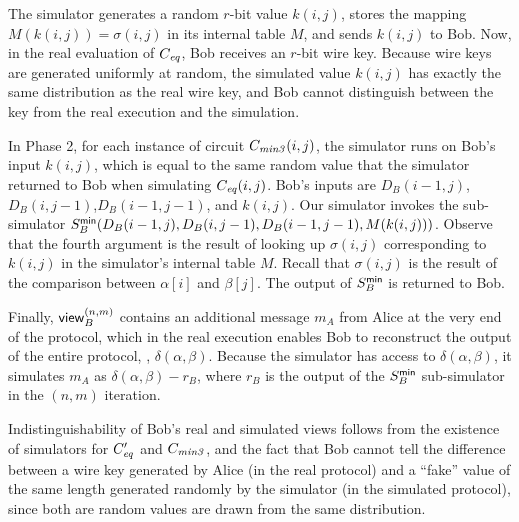 The simulator generates a random $r$-bit value $k(i,j)$, stores the
mapping $M(k(i,j))=\sigma(i,j)$ in its internal table $M$, and sends
$k(i,j)$ to Bob.  Now, in the real evaluation of $C_{\mathit{eq}}$, Bob receives an
$r$-bit wire key.  Because wire keys are generated uniformly at random,
the simulated value $k(i,j)$ has exactly the same distribution as the
real wire key, and Bob cannot distinguish between the key from the real
execution and the simulation.

In Phase 2, for each instance of circuit $C_{\mathit{min3}}(i,j)$, the simulator runs
on Bob's input $k(i,j)$, which is equal to the same random value that the
simulator returned to Bob when simulating $C_{\mathit{eq}}(i,j)$.  Bob's inputs are
$D_B(i-1,j)$,$D_B(i,j-1)$,$D_B(i-1,j-1)$, and $k(i,j)$.  Our simulator
invokes the sub-simulator $S^\mathsf{min}_B(D_B(i-1,j),D_B(i,j-1),D_B(i-1,j-1),
M(k(i,j)))$.  Observe that the fourth argument is the result of looking
up $\sigma(i,j)$ corresponding to $k(i,j)$ in the simulator's internal
table $M$.  Recall that $\sigma(i,j)$ is the result of the comparison
between $\alpha[i]$ and $\beta[j]$.  The output of $S^\mathsf{min}_B$ is returned
to Bob.

Finally, $\mathsf{view}_B^{(n,m)}$ contains an additional message $m_A$ from
Alice at the very end of the protocol, which in the real execution
enables Bob to reconstruct the output of the entire protocol,
\ie, $\delta(\alpha,\beta)$.  Because the simulator has access to
$\delta(\alpha,\beta)$, it simulates $m_A$ as $\delta(\alpha,\beta)-r_B$,
where $r_B$ is the output of the $S^\mathsf{min}_B$ sub-simulator in the $(n,m)$
iteration.

Indistinguishability of Bob's real and simulated views follows from the
existence of simulators for $C_{\mathit{eq}}'$ and $C_{\mathit{min3}}$, and the fact that Bob
cannot tell the difference between a wire key generated by Alice (in
the real protocol) and a ``fake'' value of the same length generated
randomly by the simulator (in the simulated protocol), since both are
random values are drawn from the same distribution.


